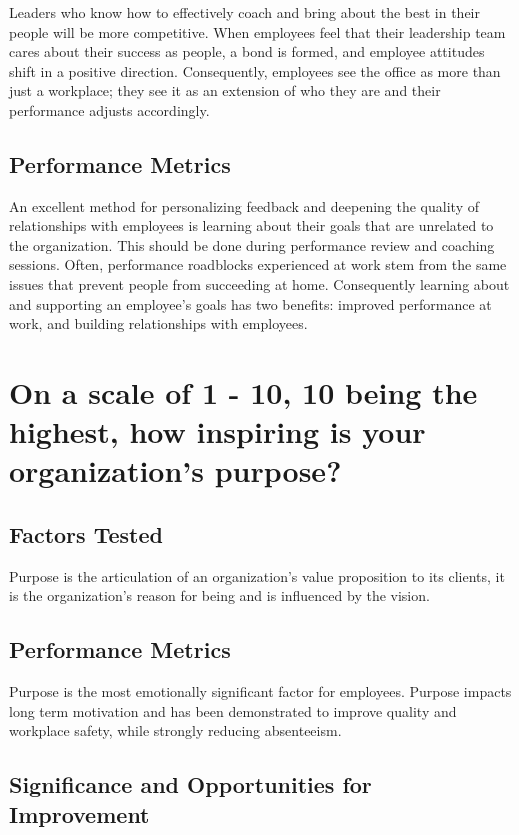 \documentclass[14pt]{extreport}
\begin{document}
\subsubsection*{}
Leaders who know how to effectively coach and bring about the best in their people will be more competitive. When employees feel that their leadership team cares about their success as people, a bond is formed, and employee attitudes shift in a positive direction. Consequently, employees see the office as more than just a workplace; they see it as an extension of who they are and their performance adjusts accordingly.

\subsection*{\centering Performance Metrics}
An excellent method for personalizing feedback and deepening the quality of relationships with employees is learning about their goals that are unrelated to the organization. This should be done during performance review and coaching sessions. Often, performance roadblocks experienced at work stem from the same issues that prevent people from succeeding at home. Consequently learning about and supporting an employee’s goals has two benefits: improved performance at work, and building relationships with employees.


\newpage
\section*{On a scale of 1 - 10, 10 being the highest, how inspiring is your organization's purpose?}

\subsection*{\centering Factors Tested}
Purpose is the articulation of an organization's value proposition
to its clients, it is the organization's reason for being and is
influenced by the vision.
\subsection*{\centering Performance Metrics}
Purpose is the most emotionally significant factor for employees. Purpose impacts long term motivation and has been demonstrated to improve quality
and workplace safety, while strongly reducing absenteeism.

\subsection*{\centering Significance and Opportunities for Improvement}
\end{document}
